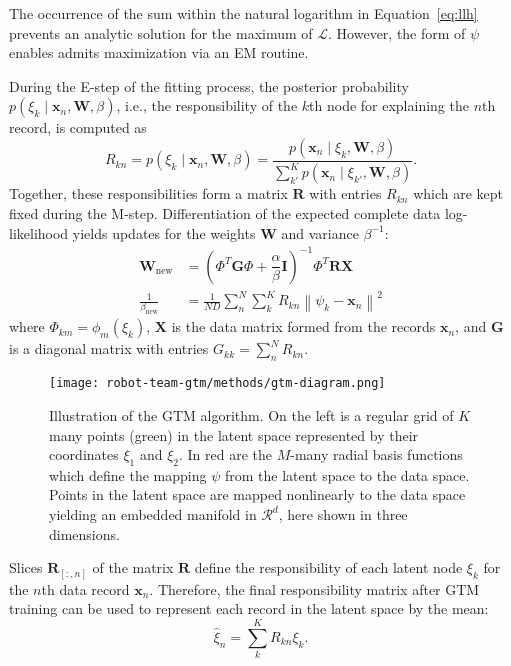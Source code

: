 The occurrence of the sum within the natural logarithm in
Equation~\eqref{eq:llh} prevents an analytic solution for the maximum of
$\mathscr{L}$. However, the form of $\psi$ enables admits maximization via an EM
routine.

During the E-step of the fitting process, the posterior probability
$p(\xi_k \mid \mathbf{x}_n, \mathbf{W}, \beta)$, i.e., the responsibility of the $k$th
node for explaining the $n$th record, is computed as
\begin{equation}\label{eq:responsibility}
    R_{kn} = p(\xi_k \mid \mathbf{x}_n, \mathbf{W}, \beta) = \dfrac{p(\mathbf{x}_n \mid \xi_k, \mathbf{W}, \beta)}{\sum\limits_{k'}^{K} p(\mathbf{x}_n \mid \xi_{k'}, \mathbf{W}, \beta)}.
\end{equation}
Together, these responsibilities form a matrix $\mathbf{R}$ with entries
$R_{kn}$ which are kept fixed during the M-step. Differentiation of the expected
complete data log-likelihood yields updates for the weights $\mathbf{W}$ and
variance $\beta^{-1}$:
\begin{align}\label{eq:m-step}
    \mathbf{W}_{\text{new}} &= \left(\Phi^T \mathbf{G} \Phi + \dfrac{\alpha}{\beta}\mathbf{I} \right)^{-1} \Phi^T \mathbf{R} \mathbf{X}  \\
    \frac{1}{\beta_{\text{new}}} &= \frac{1}{ND} \sum\limits_{n}^{N} \sum\limits_{k}^{K} R_{kn} \left\lVert \psi_k - \mathbf{x}_n \right\rVert^2
\end{align}
where $\Phi_{km} = \phi_m(\xi_k)$, $\mathbf{X}$ is the data matrix formed from
the records $\mathbf{x}_n$, and $\mathbf{G}$ is a diagonal matrix with entries
$G_{kk} = \sum\limits_n^N R_{kn}$.

\begin{figure}[H]
  \centering
  \texttt{[image: robot-team-gtm/methods/gtm-diagram.png]}
  \caption{Illustration of the GTM algorithm. On the left is a regular grid of
    $K$ many points (green) in the latent space represented by their coordinates
    $\xi_1$ and $\xi_2$. In red are the $M$-many radial basis functions which
    define the mapping $\psi$ from the latent space to the data space. Points in
    the latent space are mapped nonlinearly to the data space yielding an
    embedded manifold in $\mathcal{R}^d$, here shown in three dimensions.}
  \label{fig:gtm-diagram}
\end{figure}


Slices $\mathbf{R}_{[:,n]}$ of the matrix $\mathbf{R}$ define the responsibility
of each latent node $\xi_k$ for the $n$th data record $\mathbf{x}_n$. Therefore,
the final responsibility matrix after GTM training can be used to represent each
record in the latent space by the mean:
\begin{equation}\label{eq:mean-resp}
    \hat{\xi}_n = \sum_{k}^K R_{kn}\xi_k.
\end{equation}

